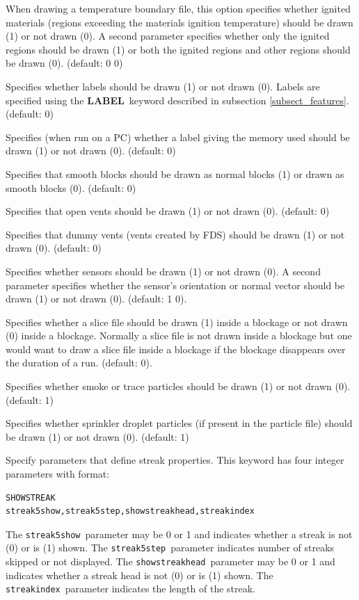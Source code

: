 \documentclass[11pt,twoside]{book}
\newcommand{\hitem}[1]{\item[{\bf #1} \hfill]}
\begin{document}
\hitem{SHOWIGNITION} When drawing a temperature boundary file, this option
specifies whether ignited materials (regions exceeding the materials ignition temperature) should be drawn (1) or not drawn (0).  A second parameter specifies whether only the ignited regions should be drawn (1) or both the ignited regions and other regions should be drawn (0).
(default: 0 0)


\hitem{SHOWLABELS}Specifies whether labels should be drawn (1) or
not drawn (0).  Labels are specified using the {\bf LABEL}\
keyword described in subsection \ref{subsect_features}. (default:
0)

\hitem{SHOWMEMLOAD} Specifies (when run on a PC) whether a label
giving the memory used should be drawn (1) or not drawn (0).
(default: 0)

\hitem{SHOWNORMALWHENSMOOTH} Specifies that smooth blocks
should be drawn as normal blocks (1) or drawn as smooth
blocks (0). (default: 0)

\hitem{SHOWOPENVENTS} Specifies that open vents should be drawn
(1) or not drawn (0).  (default: 0)

\hitem{SHOWDUMMYVENTS} Specifies that dummy vents (vents created
by FDS) should be drawn (1) or not drawn (0).  (default: 0)

\hitem{SHOWSENSORS} Specifies whether sensors should be drawn (1) or not drawn (0).
A second parameter specifies whether the sensor's orientation or normal vector
should be drawn (1) or not drawn (0). (default: 1 0).

\hitem{SHOWSLICEINOBST} Specifies whether a slice file should be drawn (1) inside
a blockage or not drawn (0) inside a blockage.  Normally a slice file is not drawn inside a blockage but one would want to draw a
slice file inside a blockage if the blockage disappears over the duration of a run.  (default: 0).


\hitem{SHOWSMOKEPART}Specifies whether smoke or trace particles
should be drawn (1) or not drawn (0). (default: 1)

\hitem{SHOWSPRINKPART}Specifies whether
sprinkler droplet particles (if present in the particle file)
should be drawn (1) or not drawn (0).
(default: 1)

\hitem{SHOWSTREAK}Specify parameters that define streak properties.  This keyword
has four integer parameters with format:
\begin{verbatim}
SHOWSTREAK
streak5show,streak5step,showstreakhead,streakindex
\end{verbatim}
The {\tt streak5show}\ parameter may be 0 or 1 and indicates whether a
streak is not (0) or is (1) shown. The {\tt streak5step}\ parameter
indicates number of streaks skipped or not displayed.
The {\tt showstreakhead}\ parameter may be 0 or 1 and indicates whether a streak head is not (0) or is (1) shown.
The {\tt streakindex}\ parameter indicates the length of the streak.
\end{document}

